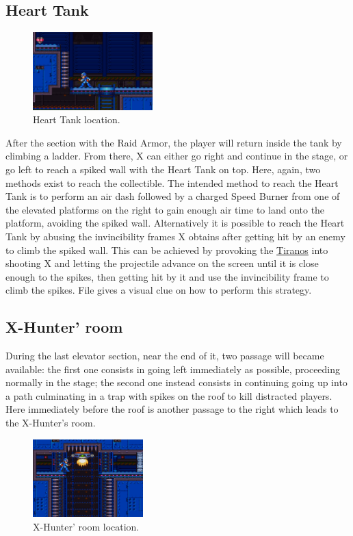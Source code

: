 \subsection{Heart Tank}
\begin{figure}[htp]
	\centering
	\includegraphics[height=3cm]{figures/X2/Wheel_gator/Gator_heart.png}
	\caption{Heart Tank location.}
\end{figure}
After the section with the Raid Armor, the player will return inside the tank by climbing a ladder. From there, X can either go right and continue in the stage, or go left to reach a spiked wall with the Heart Tank on top. Here, again, two methods exist to reach the collectible. The intended method to reach the Heart Tank is to perform an air dash followed by a charged Speed Burner from one of the elevated platforms on the right to gain enough air time to land onto the platform, avoiding the spiked wall. Alternatively it is possible to reach the Heart Tank by abusing the invincibility frames X obtains after getting hit by an enemy to climb the spiked wall. This can be achieved by provoking the \hyperlink {enem:Tiranos}{Tiranos} into shooting X and letting the projectile advance on the screen until it is close enough to the spikes, then getting hit by it and use the invincibility frame to climb the spikes. File  gives a visual clue on how to perform this strategy.


\subsection{X-Hunter' room}
During the last elevator section, near the end of it, two passage will became available: the first one consists in going left immediately as possible, proceeding normally in the stage; the second one instead consists in continuing going up into a path culminating in a trap with spikes on the roof to kill distracted players. Here immediately before the roof is another passage to the right which leads to the X-Hunter's room.
\begin{figure}[htp]
	\centering
	\includegraphics[height=3cm]{figures/X2/Wheel_gator/Gator_Hunter_room.png}
	\caption{X-Hunter' room location.}
\end{figure}

